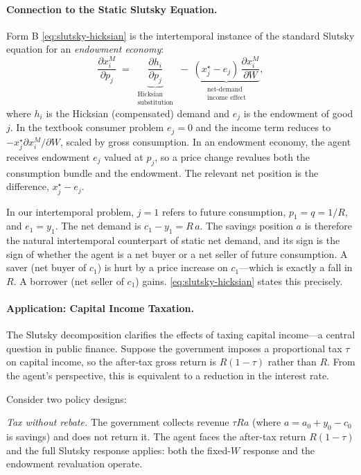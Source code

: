 \paragraph{Connection to the Static Slutsky Equation.}
Form B \cref{eq:slutsky-hicksian} is the intertemporal instance of the standard Slutsky equation for an \emph{endowment economy}:
\begin{equation}
\frac{\partial x_i^M}{\partial p_j} \;=\; \underbrace{\frac{\partial h_i}{\partial p_j}}_{\substack{\text{Hicksian}\\\text{substitution}}} \;-\; \underbrace{(x_j^\star - e_j)\,\frac{\partial x_i^M}{\partial W}}_{\substack{\text{net-demand}\\\text{income effect}}},
\label{eq:slutsky-static}
\end{equation}
where $h_i$ is the Hicksian (compensated) demand and $e_j$ is the endowment of good $j$. In the textbook consumer problem $e_j = 0$ and the income term reduces to $-x_j^\star \partial x_i^M / \partial W$, scaled by gross consumption. In an endowment economy, the agent receives endowment $e_j$ valued at $p_j$, so a price change revalues both the consumption bundle and the endowment. The relevant net position is the difference, $x_j^\star - e_j$.

In our intertemporal problem, $j = 1$ refers to future consumption, $p_1 = q = 1/R$, and $e_1 = y_1$. The net demand is $c_1 - y_1 = R\,a$. The savings position $a$ is therefore the natural intertemporal counterpart of static net demand, and its sign is the sign of whether the agent is a net buyer or a net seller of future consumption. A saver (net buyer of $c_1$) is hurt by a price increase on $c_1$---which is exactly a fall in $R$. A borrower (net seller of $c_1$) gains. \cref{eq:slutsky-hicksian} states this precisely.

\paragraph{Application: Capital Income Taxation.}
The Slutsky decomposition clarifies the effects of taxing capital income---a central question in public finance. Suppose the government imposes a proportional tax $\tau$ on capital income, so the after-tax gross return is $R(1-\tau)$ rather than $R$. From the agent's perspective, this is equivalent to a reduction in the interest rate.

Consider two policy designs:

\medskip
\noindent
\textit{Tax without rebate.} The government collects revenue $\tau R a$ (where $a = a_0 + y_0 - c_0$ is savings) and does not return it. The agent faces the after-tax return $R(1-\tau)$ and the full Slutsky response applies: both the fixed-$W$ response and the endowment revaluation operate.


